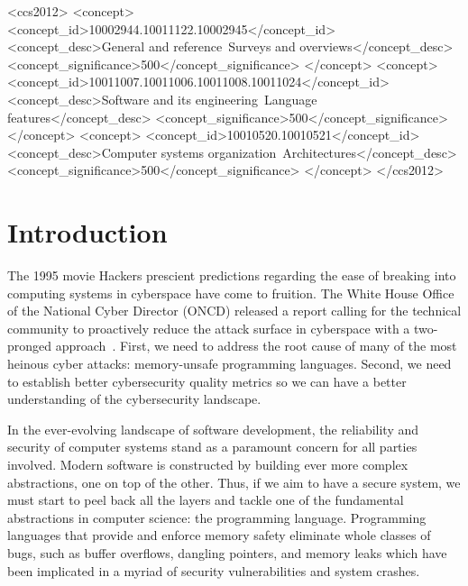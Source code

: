 \documentclass[sigconf]{acmart}
\begin{document}
\begin{CCSXML}
<ccs2012>
<concept>
<concept_id>10002944.10011122.10002945</concept_id>
<concept_desc>General and reference~Surveys and overviews</concept_desc>
<concept_significance>500</concept_significance>
</concept>
<concept>
<concept_id>10011007.10011006.10011008.10011024</concept_id>
<concept_desc>Software and its engineering~Language features</concept_desc>
<concept_significance>500</concept_significance>
</concept>
<concept>
<concept_id>10010520.10010521</concept_id>
<concept_desc>Computer systems organization~Architectures</concept_desc>
<concept_significance>500</concept_significance>
</concept>
</ccs2012>
\end{CCSXML}






\maketitle

\section{Introduction}

The 1995 movie Hackers prescient predictions regarding the ease
of breaking into computing systems in cyberspace have come to fruition. The White House Office of
the National Cyber Director (ONCD) released a report calling for the technical community to
proactively reduce the attack surface in cyberspace with a two-pronged approach~\cite{United_States_Gov2024-pp}. First, we need to
address the root cause of many of the most heinous cyber attacks: memory-unsafe programming
languages. Second, we need to establish better cybersecurity quality
metrics so we can have a better understanding of the cybersecurity landscape.

In the ever-evolving landscape of software development, the reliability and security of computer
systems stand as a paramount concern for all parties involved. Modern software is constructed by
building ever more complex abstractions, one on top of the other. Thus, if we aim to have a secure
system, we must start to peel back all the layers and tackle one of the fundamental abstractions in
computer science: the programming language. Programming languages that provide and enforce memory
safety eliminate whole classes of bugs, such as buffer overflows, dangling pointers, and memory leaks
which have been implicated in a myriad of security vulnerabilities and system crashes.
\end{document}
